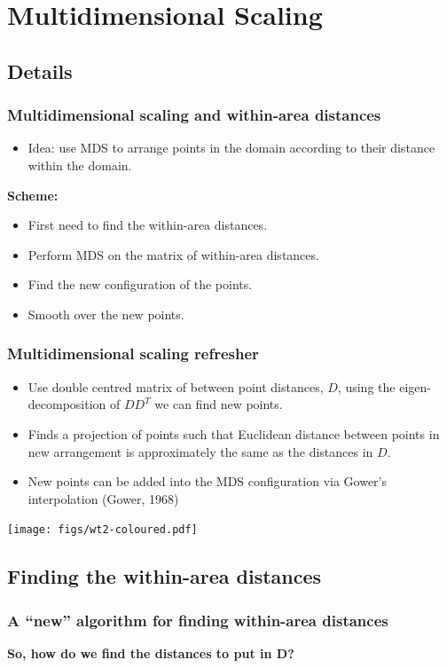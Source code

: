 \documentclass[ignorenonframetext]{beamer} %
\newcommand{\bc}{\begin{center}}
\newcommand{\ec}{\end{center}}
\newcommand{\bi}{\begin{itemize}}
\newcommand{\ei}{\end{itemize}}
\begin{document}
\section{Multidimensional Scaling}

\subsection{Details}

\begin{frame}
	\frametitle{Multidimensional scaling and within-area distances}
       \bi
         \item Idea: use MDS to arrange points in the domain according to their distance within the domain.
         \ei
         \bc \textbf{Scheme:} \ec
         \bi
         \item First need to find the within-area distances.
         \item Perform MDS on the matrix of within-area distances.
         \item Find the new configuration of the points.
         \item Smooth over the new points.
        \ei
\end{frame}

\begin{frame}
	\frametitle{Multidimensional scaling refresher}
       \bi
         \item Use double centred matrix of between point distances, $D$, using the eigen-decomposition of $DD^T$ we can find new points.
         \item Finds a projection of points such that Euclidean distance between points in new arrangement is approximately the same as the distances in $D$.
          \item New points can be added into the MDS configuration via Gower's interpolation (Gower, 1968)
        \ei
            \centering
              \texttt{[image: figs/wt2-coloured.pdf]}\\
        
\end{frame}

\subsection{Finding the within-area distances}

\begin{frame}
	\frametitle{A ``new'' algorithm for finding within-area distances}

	\bc \textbf{So, how do we find the distances to put in D?}\ec
\end{frame}
\end{document}
